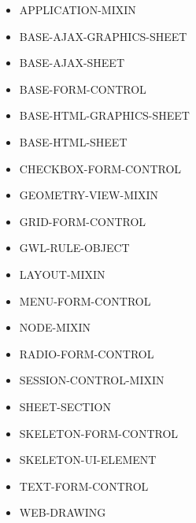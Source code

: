 \documentclass [11pt]{book}
\begin{document}
\begin{itemize}

\item {}APPLICATION-MIXIN

\item {}BASE-AJAX-GRAPHICS-SHEET

\item {}BASE-AJAX-SHEET

\item {}BASE-FORM-CONTROL

\item {}BASE-HTML-GRAPHICS-SHEET

\item {}BASE-HTML-SHEET

\item {}CHECKBOX-FORM-CONTROL

\item {}GEOMETRY-VIEW-MIXIN

\item {}GRID-FORM-CONTROL

\item {}GWL-RULE-OBJECT

\item {}LAYOUT-MIXIN

\item {}MENU-FORM-CONTROL

\item {}NODE-MIXIN

\item {}RADIO-FORM-CONTROL

\item {}SESSION-CONTROL-MIXIN

\item {}SHEET-SECTION

\item {}SKELETON-FORM-CONTROL

\item {}SKELETON-UI-ELEMENT

\item {}TEXT-FORM-CONTROL

\item {}WEB-DRAWING

\end{itemize}
\end{document}
